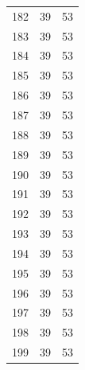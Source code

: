 \begin{table}
\begin{tabular}{rrr}
182 & 39 & 53 \\
183 & 39 & 53 \\
184 & 39 & 53 \\
185 & 39 & 53 \\
186 & 39 & 53 \\
187 & 39 & 53 \\
188 & 39 & 53 \\
189 & 39 & 53 \\
190 & 39 & 53 \\
191 & 39 & 53 \\
192 & 39 & 53 \\
193 & 39 & 53 \\
194 & 39 & 53 \\
195 & 39 & 53 \\
196 & 39 & 53 \\
197 & 39 & 53 \\
198 & 39 & 53 \\
199 & 39 & 53 \\
\bottomrule
\end{tabular}
\end{table}
